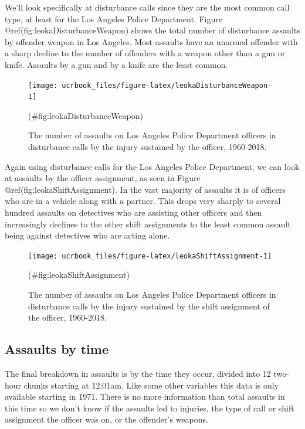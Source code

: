 \documentclass[
  12pt,
  openany]{book}
\begin{document}
We'll look specifically at disturbance calls since they are the most common call type, at least for the Los Angeles Police Department. Figure @ref(fig:leokaDisturbanceWeapon) shows the total number of disturbance assaults by offender weapon in Los Angeles. Most assaults have an unarmed offender with a sharp decline to the number of offenders with a weapon other than a gun or knife. Assaults by a gun and by a knife are the least common.

\begin{figure}

{\centering \texttt{[image: ucrbook\_files/figure-latex/leokaDisturbanceWeapon-1]} 

}

\caption{The number of assaults on Los Angeles Police Department officers in disturbance calls by the injury sustained by the officer, 1960-2018.}(\#fig:leokaDisturbanceWeapon)
\end{figure}

Again using disturbance calls for the Los Angeles Police Department, we can look at assaults by the officer assignment, as seen in Figure @ref(fig:leokaShiftAssignment). In the vast majority of assaults it is of officers who are in a vehicle along with a partner. This drops very sharply to several hundred assaults on detectives who are assisting other officers and then increasingly declines to the other shift assignments to the least common assault being against detectives who are acting alone.

\begin{figure}

{\centering \texttt{[image: ucrbook\_files/figure-latex/leokaShiftAssignment-1]} 

}

\caption{The number of assaults on Los Angeles Police Department officers in disturbance calls by the injury sustained by the shift assignment of the officer, 1960-2018.}(\#fig:leokaShiftAssignment)
\end{figure}

\hypertarget{assaults-by-time}{%
\subsection{Assaults by time}\label{assaults-by-time}}

The final breakdown in assaults is by the time they occur, divided into 12 two-hour chunks starting at 12:01am. Like some other variables this data is only available starting in 1971. There is no more information than total assaults in this time so we don't know if the assaults led to injuries, the type of call or shift assignment the officer was on, or the offender's weapons.
\end{document}
